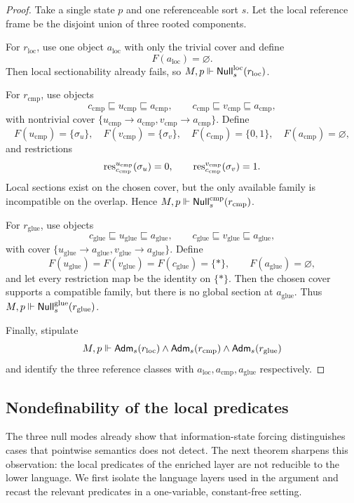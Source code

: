 \begin{proof}
Take a single state $p$ and one referenceable sort $s$. Let the local reference frame be the disjoint union of three rooted components.

For $r_{\mathrm{loc}}$, use one object $a_{\mathrm{loc}}$ with only the trivial cover and define
\[
F(a_{\mathrm{loc}})=\varnothing.
\]
Then local sectionability already fails, so $M,p\Vdash \mathsf{Null}^{\mathrm{loc}}_s(r_{\mathrm{loc}})$.

For $r_{\mathrm{cmp}}$, use objects
\[
c_{\mathrm{cmp}}\sqsubseteq u_{\mathrm{cmp}}\sqsubseteq a_{\mathrm{cmp}},
\qquad
c_{\mathrm{cmp}}\sqsubseteq v_{\mathrm{cmp}}\sqsubseteq a_{\mathrm{cmp}},
\]
with nontrivial cover $\{u_{\mathrm{cmp}}\to a_{\mathrm{cmp}},v_{\mathrm{cmp}}\to a_{\mathrm{cmp}}\}$. Define
\[
F(u_{\mathrm{cmp}})=\{\sigma_u\},\quad
F(v_{\mathrm{cmp}})=\{\sigma_v\},\quad
F(c_{\mathrm{cmp}})=\{0,1\},\quad
F(a_{\mathrm{cmp}})=\varnothing,
\]
and restrictions
\[
\mathrm{res}_{c_{\mathrm{cmp}}}^{u_{\mathrm{cmp}}}(\sigma_u)=0,
\qquad
\mathrm{res}_{c_{\mathrm{cmp}}}^{v_{\mathrm{cmp}}}(\sigma_v)=1.
\]
Local sections exist on the chosen cover, but the only available family is incompatible on the overlap. Hence $M,p\Vdash \mathsf{Null}^{\mathrm{cmp}}_s(r_{\mathrm{cmp}})$.

For $r_{\mathrm{glue}}$, use objects
\[
c_{\mathrm{glue}}\sqsubseteq u_{\mathrm{glue}}\sqsubseteq a_{\mathrm{glue}},
\qquad
c_{\mathrm{glue}}\sqsubseteq v_{\mathrm{glue}}\sqsubseteq a_{\mathrm{glue}},
\]
with cover $\{u_{\mathrm{glue}}\to a_{\mathrm{glue}},v_{\mathrm{glue}}\to a_{\mathrm{glue}}\}$. Define
\[
F(u_{\mathrm{glue}})=F(v_{\mathrm{glue}})=F(c_{\mathrm{glue}})=\{*\},
\qquad
F(a_{\mathrm{glue}})=\varnothing,
\]
and let every restriction map be the identity on $\{*\}$. Then the chosen cover supports a compatible family, but there is no global section at $a_{\mathrm{glue}}$. Thus $M,p\Vdash \mathsf{Null}^{\mathrm{glue}}_s(r_{\mathrm{glue}})$.

Finally, stipulate
\[
M,p\Vdash \mathsf{Adm}_s(r_{\mathrm{loc}})\land \mathsf{Adm}_s(r_{\mathrm{cmp}})\land \mathsf{Adm}_s(r_{\mathrm{glue}})
\]
and identify the three reference classes with $a_{\mathrm{loc}},a_{\mathrm{cmp}},a_{\mathrm{glue}}$ respectively.
\end{proof}

\subsection{Nondefinability of the local predicates}

The three null modes already show that information-state forcing distinguishes cases that pointwise semantics does not detect. The next theorem sharpens this observation: the local predicates of the enriched layer are not reducible to the lower language. We first isolate the language layers used in the argument and recast the relevant predicates in a one-variable, constant-free setting.

